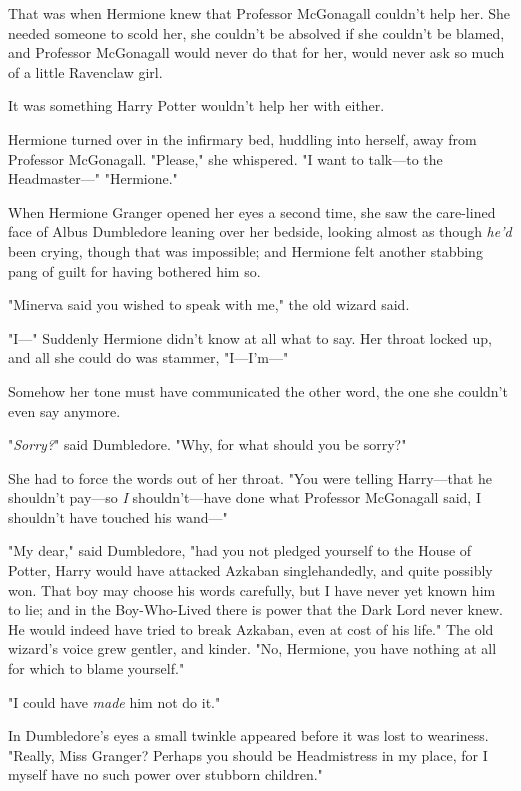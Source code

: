 That was when Hermione knew that Professor McGonagall couldn't help her. She 
needed someone to scold her, she couldn't be absolved if she couldn't be 
blamed, and Professor McGonagall would never do that for her, would never ask 
so much of a little Ravenclaw girl.

It was something Harry Potter wouldn't help her with either.

Hermione turned over in the infirmary bed, huddling into herself, away from 
Professor McGonagall. "Please," she whispered. "I want to talk---to the 
Headmaster---"
\sbreak
"Hermione."

When Hermione Granger opened her eyes a second time, she saw the care-lined 
face of Albus Dumbledore leaning over her bedside, looking almost as though 
\emph{he'd} been crying, though that was impossible; and Hermione felt another 
stabbing pang of guilt for having bothered him so.

"Minerva said you wished to speak with me," the old wizard said.

"I---" Suddenly Hermione didn't know at all what to say. Her throat locked up, 
and all she could do was stammer, "I---I'm---"

Somehow her tone must have communicated the other word, the one she couldn't 
even say anymore.

"\emph{Sorry?}" said Dumbledore. "Why, for what should you be sorry?"

She had to force the words out of her throat. "You were telling Harry---that he 
shouldn't pay---so\emph{ I} shouldn't---have done what Professor McGonagall 
said, I shouldn't have touched his wand---"

"My dear," said Dumbledore, "had you not pledged yourself to the House of 
Potter, Harry would have attacked Azkaban singlehandedly, and quite possibly 
won. That boy may choose his words carefully, but I have never yet known him to 
lie; and in the Boy-Who-Lived there is power that the Dark Lord never knew. He 
would indeed have tried to break Azkaban, even at cost of his life." The old 
wizard's voice grew gentler, and kinder. "No, Hermione, you have nothing at all 
for which to blame yourself."

"I could have \emph{made} him not do it."

In Dumbledore's eyes a small twinkle appeared before it was lost to weariness. 
"Really, Miss Granger? Perhaps you should be Headmistress in my place, for I 
myself have no such power over stubborn children."


